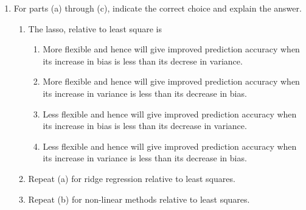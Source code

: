 \documentclass[11pt, a4paper]{article}
\begin{document}
\begin{enumerate}
        \item For parts (a) through (c), indicate the correct choice and explain the answer.
        \begin{enumerate}
            \item The lasso, relative to least square is
            \begin{enumerate}
                \item More flexible and hence will give improved prediction accuracy when its increase in bias is less than its decrese in variance.
                \item More flexible and hence will give improved prediction accuracy when its increase in variance is less than its decrease in bias.
                \item Less flexible and hence will give improved prediction accuracy when its increase in bias is less than its decrease in variance.
                \item Less flexible and hence will give improved prediction accuracy when its increase in variance is less than its decrease in bias.
            \end{enumerate}
            \item Repeat (a) for ridge regression relative to least squares.
            \item Repeat (b) for non-linear methods relative to least squares.
        \end{enumerate}
        

\end{enumerate}
\end{document}
